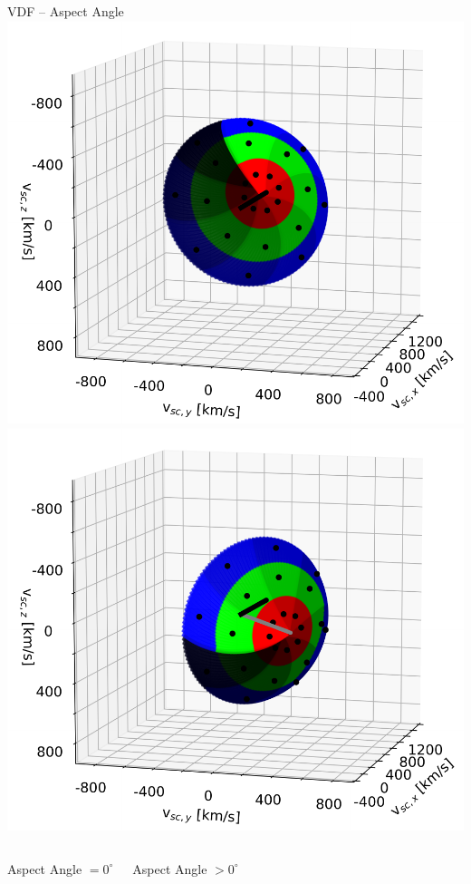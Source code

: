 \documentclass{beamer}
\begin{document}
\begin{frame}{VDF -- Aspect Angle}
	\vspace{1.cm}
	\includegraphics[scale=0.35]{Pics/figure_1-1_swics.pdf}
	\includegraphics[scale=0.35]{Pics/figure_2-1_swics.pdf}
	\begin{columns}
		\vspace{1.5cm}
		\column[]{5cm}
		\begin{center}
			Aspect Angle $= 0 ^{\circ}$
		\end{center}
		\column[]{5cm}
		\begin{center}
			Aspect Angle $> 0 ^{\circ}$
		\end{center}
	\end{columns}
\end{frame}
\end{document}
